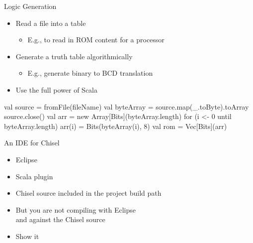 \documentclass[xcolor=pdflatex,dvipsnames,table]{beamer}
\begin{document}
\begin{frame}[fragile]{Logic Generation}
\begin{itemize}
\item Read a file into a table
\begin{itemize}
\item E.g., to read in ROM content for a processor
\end{itemize}
\item Generate a truth table algorithmically
\begin{itemize}
\item E.g., generate binary to BCD translation
\end{itemize}
\item Use the full power of Scala
\end{itemize}
\begin{chisel}
val source = fromFile(fileName)
val byteArray = source.map(_.toByte).toArray
source.close()
val arr = new Array[Bits](byteArray.length)
for (i <- 0 until byteArray.length) {
  arr(i) = Bits(byteArray(i), 8)
}
val rom = Vec[Bits](arr)
\end{chisel}
\end{frame}
%



\begin{frame}[fragile]{An IDE for Chisel}
\begin{itemize}
\item Eclipse
\item Scala plugin
\item Chisel source included in the project build path
\item But you are not compiling with Eclipse\\ and against the Chisel source
\item Show it
\end{itemize}
\end{frame}
\end{document}

